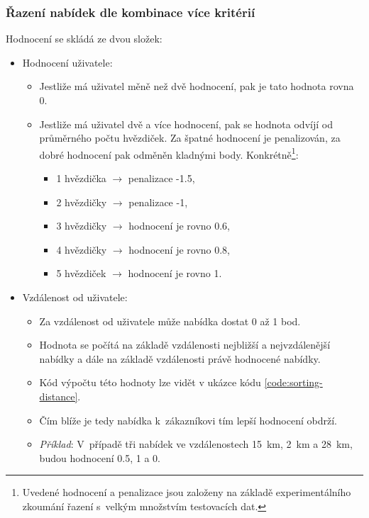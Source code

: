 \subsubsection{Řazení nabídek dle kombinace více kritérií}
Hodnocení se skládá ze dvou složek:
\begin{itemize}
	\item Hodnocení uživatele:
        \begin{itemize}
            \item Jestliže má uživatel měně než dvě hodnocení, pak je tato hodnota rovna 0.
            \item Jestliže má uživatel dvě a více hodnocení, pak se hodnota odvíjí od průměrného počtu hvězdiček. Za špatné hodnocení je penalizován, za dobré hodnocení pak odměněn kladnými body. Konkrétně\footnote{Uvedené hodnocení a penalizace jsou založeny na základě experimentálního zkoumání řazení s~velkým množstvím testovacích dat.}:
            \begin{itemize}
                \item 1 hvězdička $\rightarrow$ penalizace -1.5,
                \item 2 hvězdičky $\rightarrow$ penalizace -1,
                \item 3 hvězdičky $\rightarrow$ hodnocení je rovno 0.6,
                \item 4 hvězdičky $\rightarrow$ hodnocení je rovno 0.8,
                \item 5 hvězdiček $\rightarrow$ hodnocení je rovno 1.
            \end{itemize}
        \end{itemize}
	\item Vzdálenost od uživatele:
        \begin{itemize}
            \item Za vzdálenost od uživatele může nabídka dostat 0 až 1 bod.
            \item Hodnota se počítá na základě vzdálenosti nejbližší a nejvzdálenější nabídky a dále na základě vzdálenosti právě hodnocené nabídky.
            \item Kód výpočtu této hodnoty lze vidět v ukázce kódu \ref{code:sorting-distance}.
            \item Čím blíže je tedy nabídka k~zákazníkovi tím lepší hodnocení obdrží.
            \item \textit{Příklad}: V~případě tři nabídek ve vzdálenostech 15~km, 2~km a 28~km, budou hodnocení 0.5, 1 a 0.
        \end{itemize}
\end{itemize}

